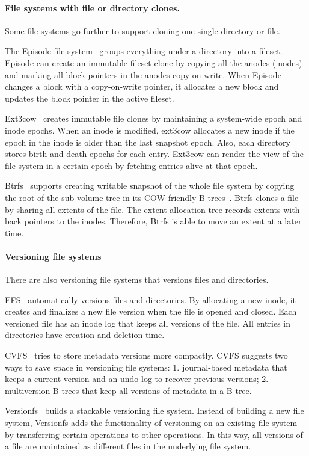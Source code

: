 \paragraph{File systems with file or directory clones.}

Some file systems go further to support cloning one single directory or file.

The Episode file system~\citep{episode} groups everything under a directory into
a fileset.
Episode can create an immutable fileset clone by copying all the anodes (inodes)
and marking all block pointers in the anodes copy-on-write.
When Episode changes a block with a copy-on-write pointer, it allocates a new
block and updates the block pointer in the active fileset.

Ext3cow~\citep{ext3cow} creates immutable file clones by maintaining a
system-wide epoch and inode epochs.
When an inode is modified, ext3cow allocates a new inode if the epoch in the
inode is older than the last snapshot epoch.
Also, each directory stores birth and death epochs for each entry.
Ext3cow can render the view of the file system in a certain epoch by fetching
entries alive at that epoch.

Btrfs~\citep{btrfs} supports creating writable snapshot of the whole file system
by copying the root of the sub-volume tree in its COW friendly
B-trees~\citep{cowbtree}.
Btrfs clones a file by sharing all extents of the file.
The extent allocation tree records extents with back pointers to the inodes.
Therefore, Btrfs is able to move an extent at a later time.

\paragraph{Versioning file systems}

There are also versioning file systems that versions files and directories.

EFS~\citep{efs} automatically versions files and directories.
By allocating a new inode, it creates and finalizes a new file version when the
file is opened and closed.
Each versioned file has an inode log that keeps all versions of the file.
All entries in directories have creation and deletion time.

CVFS~\citep{cvfs} tries to store metadata versions more compactly.
CVFS suggests two ways to save space in versioning file systems:
1. journal-based metadata that keeps a current version and an undo log to
recover previous versions;
2. multiversion B-trees that keep all versions of metadata in a B-tree.

Versionfs~\citep{versionfs} builds a stackable versioning file system.
Instead of building a new file system, Versionfs adds the functionality of
versioning on an existing file system by transferring certain operations to
other operations.
In this way, all versions of a file are maintained as different files in the
underlying file system.
